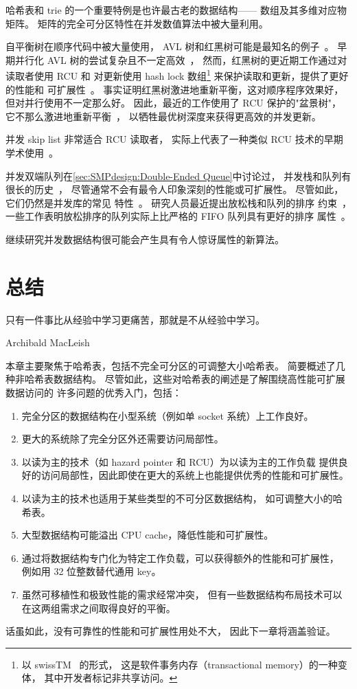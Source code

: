 哈希表和 trie 的一个重要特例是也许最古老的数据结构——
数组及其多维对应物矩阵。
矩阵的完全可分区特性在并发数值算法中被大量利用。

自平衡树在顺序代码中被大量使用，
AVL 树和红黑树可能是最知名的例子~\cite{ThomasHCorman2001Algorithms}。
早期并行化 AVL 树的尝试复杂且不一定高效~\cite{Ellis80}，
然而，红黑树的更近期工作通过对读取者使用 RCU 和
对更新使用 hash lock 数组\footnote{
	以 swissTM~\cite{AleksandarDragovejic2011STMnotToy} 的形式，
	这是软件事务内存（transactional memory）的一种变体，
	其中开发者标记非共享访问。}
来保护读取和更新，提供了更好的性能和
可扩展性~\cite{PhilHoward2011RCUTMRBTree,PhilipWHoward2013RCUrbtree}。
事实证明红黑树激进地重新平衡，这对顺序程序效果好，
但对并行使用不一定那么好。
因此，最近的工作使用了 RCU 保护的"盆景树"，
它不那么激进地重新平衡~\cite{AustinClements2012RCULinux:mmapsem}，
以牺牲最优树深度来获得更高效的并发更新。

并发 skip list 非常适合 RCU 读取者，
实际上代表了一种类似 RCU 技术的早期学术使用~\cite{Pugh90}。

并发双端队列在\cref{sec:SMPdesign:Double-Ended Queue}中讨论过，
并发栈和队列有很长的历史~\cite{Treiber86}，
尽管通常不会有最令人印象深刻的性能或可扩展性。
尽管如此，它们仍然是并发库的常见
特性~\cite{PaulMcKenney2013LWNURCUqueuestack}。
研究人员最近提出放松栈和队列的排序
约束~\cite{Shavit:2011:DSM:1897852.1897873}，
一些工作表明放松排序的队列实际上比严格的 FIFO
队列具有更好的排序
属性~\cite{AndreasHaas2012FIFOisnt,ChristophMKirsch2012FIFOisntTR,AndreasHaas2013CFRelaxedQueues}。

继续研究并发数据结构很可能会产生具有令人惊讶属性的新算法。

\section{总结}
\label{sec:datastruct:Summary}
%
\epigraph{只有一件事比从经验中学习更痛苦，那就是不从经验中学习。}
	 {Archibald MacLeish}

本章主要聚焦于哈希表，包括不完全可分区的可调整大小哈希表。
简要概述了几种非哈希表数据结构。
尽管如此，这些对哈希表的阐述是了解围绕高性能可扩展数据访问的
许多问题的优秀入门，包括：

\begin{enumerate}
\item	完全分区的数据结构在小型系统（例如单 socket 系统）上工作良好。
\item	更大的系统除了完全分区外还需要访问局部性。
\item	以读为主的技术（如 hazard pointer 和 RCU）为以读为主的工作负载
	提供良好的访问局部性，因此即使在更大的系统上也能提供优秀的性能和可扩展性。
\item	以读为主的技术也适用于某些类型的不可分区数据结构，
	如可调整大小的哈希表。
\item	大型数据结构可能溢出 CPU cache，降低性能和可扩展性。
\item	通过将数据结构专门化为特定工作负载，可以获得额外的性能和可扩展性，
	例如用 32 位整数替代通用 key。
\item	虽然可移植性和极致性能的需求经常冲突，
	但有一些数据结构布局技术可以在这两组需求之间取得良好的平衡。
\end{enumerate}

话虽如此，没有可靠性的性能和可扩展性用处不大，
因此下一章将涵盖验证。

